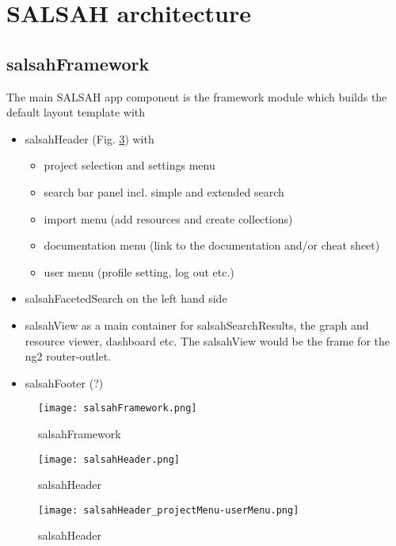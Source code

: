 \newpage
\section{SALSAH architecture}
\subsection{salsahFramework}
The main SALSAH app component is the framework module which builds the default layout template with

\begin{itemize}
	\item salsahHeader (Fig. \ref{fig:header}) with
	\begin{itemize}
		\item project selection and settings menu
		\item search bar panel incl. simple and extended search
		\item import menu (add resources and create collections)
		\item documentation menu (link to the documentation and/or cheat sheet)
		\item user menu (profile setting, log out etc.)
	\end{itemize}
	\item salsahFacetedSearch on the left hand side
	\item salsahView as a main container for salsahSearchResults, the graph and resource viewer, dashboard etc. The salsahView would be the frame for the ng2 router-outlet.
	\item salsahFooter (?)
\end{itemize}

\begin{figure}[h]
    \centering
    \texttt{[image: salsahFramework.png]}
    \caption{salsahFramework}
    \label{fig:framework}
\end{figure}

\begin{figure}[h]
    \centering
    \texttt{[image: salsahHeader.png]}
    \caption{salsahHeader}
    \label{fig:header}
\end{figure}

\begin{figure}[h]
    \centering
    \texttt{[image: salsahHeader\_projectMenu-userMenu.png]}
    \caption{salsahHeader}
    \label{fig:header}
\end{figure}

%

